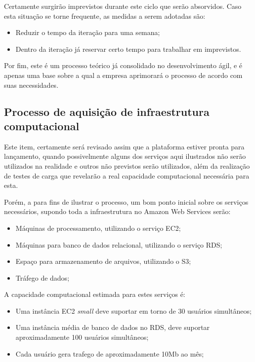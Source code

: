   Certamente surgirão imprevistos durante este ciclo que serão absorvidos. Caso esta situação se torne frequente, as medidas a serem adotadas são:
  
  \begin{itemize}
    \item Reduzir o tempo da iteração para uma semana;
    \item Dentro da iteração já reservar certo tempo para trabalhar em imprevistos.
  \end{itemize}
  
  Por fim, este é um processo teórico já consolidado no desenvolvimento ágil, e é apenas uma base sobre a qual a empresa aprimorará o processo de acordo com suas necessidades.
  
  \subsection{Processo de aquisição de infraestrutura computacional}
  
  
  Este item, certamente será revisado assim que a plataforma estiver pronta para lançamento, quando possivelmente alguns dos serviços aqui ilustrados não serão utilizados na realidade e outros não previstos serão utilizados, além da realização de testes de carga que revelarão a real capacidade computacional necessária para esta.
  
  Porém, a para fins de ilustrar o processo, um bom ponto inicial sobre os serviços necessários, supondo toda a infraestrutura no Amazon Web Services serão:
  
  \begin{itemize}
    \item Máquinas de processamento, utilizando o serviço EC2;
    \item Máquinas para banco de dados relacional, utilizando o serviço RDS;
    \item Espaço para armazenamento de arquivos, utilizando o S3;
    \item Tráfego de dados;
  \end{itemize}
  
  A capacidade computacional estimada para estes serviços é:
  
  \begin{itemize}
    \item Uma instância EC2 \textit{small} deve suportar em torno de 30 usuários simultâneos;
    \item Uma instância média de banco de dados no RDS, deve suportar aproximadamente 100 usuários simultâneos;
    \item Cada usuário gera trafego de aproximadamente 10Mb ao mês;
  \end{itemize}
   
